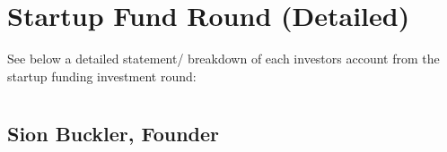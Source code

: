 \documentclass[letterpaper,10pt,openany,oneside,english]{sphinxmanual}
\begin{document}
\chapter{Startup Fund Round (Detailed)}
\label{\detokenize{detailed-startup:startup-fund-round-detailed}}\label{\detokenize{detailed-startup::doc}}
\sphinxAtStartPar
See below a detailed statement/ breakdown of each investors account from the startup funding investment round:


\chapter{}
\label{\detokenize{index:document-author}}

\section{Sion Buckler, Founder}
\label{\detokenize{index:sion-buckler-founder}}


\renewcommand{\indexname}{Index}
\printindex
\end{document}
